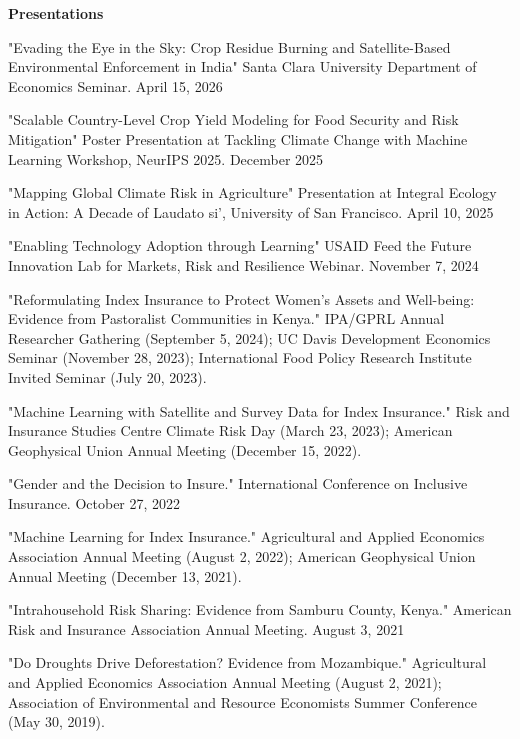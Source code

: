 \documentclass[11pt,letterpaper]{article}
\newcommand{\horse}{5pt} 	%
\newcommand{\littlehorse}{5pt}%
\newenvironment{itemize*}%
  {\begin{itemize}[topsep=0pt, partopsep=0pt, leftmargin=1.6em, itemindent=-1.6em, labelsep=0pt, labelwidth=0pt]%
    \setlength{\itemsep}{\littlehorse}%
    \setlength{\parskip}{0pt}%
    \interlinepenalty=10000}%
  {\end{itemize}\vspace{\horse}}
\newcommand{\resheading}[1]{%
  \vspace{6pt}%
  {\textbf{\large #1}}%
  \par\vspace{4pt}}
\begin{document}
\resheading{Presentations}
\begin{itemize*}

\item[]{"Evading the Eye in the Sky: Crop Residue Burning and Satellite-Based Environmental Enforcement in India" Santa Clara University Department of Economics Seminar. April 15, 2026}

\item[]{"Scalable Country-Level Crop Yield Modeling for Food Security and Risk Mitigation" Poster Presentation at Tackling Climate Change with Machine Learning Workshop, NeurIPS 2025. December 2025}

\item[]{"Mapping Global Climate Risk in Agriculture" Presentation at Integral Ecology in Action: A Decade of Laudato si', University of San Francisco. April 10, 2025}

\item[]{"Enabling Technology Adoption through Learning" USAID Feed the Future Innovation Lab for Markets, Risk and Resilience Webinar. November 7, 2024}

\item[]{"Reformulating Index Insurance to Protect Women’s Assets and Well-being: Evidence from Pastoralist Communities in Kenya." IPA/GPRL Annual Researcher Gathering (September 5, 2024); UC Davis Development Economics Seminar (November 28, 2023); International Food Policy Research Institute Invited Seminar (July 20, 2023).}

\item[]{"Machine Learning with Satellite and Survey Data for Index Insurance." Risk and Insurance Studies Centre Climate Risk Day (March 23, 2023); American Geophysical Union Annual Meeting (December 15, 2022).}

\item[]{"Gender and the Decision to Insure." International Conference on Inclusive Insurance. October 27, 2022}

\item[]{"Machine Learning for Index Insurance." Agricultural and Applied Economics Association Annual Meeting (August 2, 2022); American Geophysical Union Annual Meeting (December 13, 2021).}

\item[]{"Intrahousehold Risk Sharing: Evidence from Samburu County, Kenya." American Risk and Insurance Association Annual Meeting. August 3, 2021}

\item[]{"Do Droughts Drive Deforestation? Evidence from Mozambique." Agricultural and Applied Economics Association Annual Meeting (August 2, 2021); Association of Environmental and Resource Economists Summer Conference (May 30, 2019).}


\end{itemize*}
\end{document}

